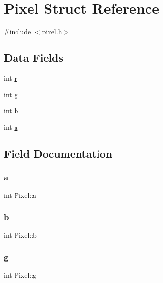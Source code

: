 \hypertarget{structPixel}{}\section{Pixel Struct Reference}
\label{structPixel}


{\ttfamily \#include $<$pixel.\+h$>$}

\subsection*{Data Fields}
\begin{DoxyCompactItemize}
\item 
int \hyperlink{structPixel_a8bdcc8f589c30333ec3f88d2c26d4e3a}{r}
\item 
int \hyperlink{structPixel_a73515f179e3c1bd28156e434da111d05}{g}
\item 
int \hyperlink{structPixel_a94b067f3c79425c953631f7bf1c7536c}{b}
\item 
int \hyperlink{structPixel_aeaad5ecfb916aef136cc8919d8e63a3c}{a}
\end{DoxyCompactItemize}


\subsection{Field Documentation}
\mbox{\label{structPixel_aeaad5ecfb916aef136cc8919d8e63a3c}} 
\subsubsection{\texorpdfstring{a}{a}}
{\footnotesize\ttfamily int Pixel\+::a}

\mbox{\label{structPixel_a94b067f3c79425c953631f7bf1c7536c}} 
\subsubsection{\texorpdfstring{b}{b}}
{\footnotesize\ttfamily int Pixel\+::b}

\mbox{\label{structPixel_a73515f179e3c1bd28156e434da111d05}} 
\subsubsection{\texorpdfstring{g}{g}}
{\footnotesize\ttfamily int Pixel\+::g}

